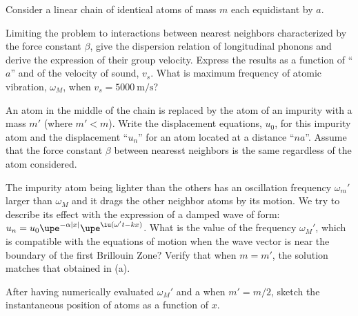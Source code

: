 \begin{problem}
  Consider a linear chain of identical atoms of mass $m$ each equidistant
  by $a$.
  \begin{enumext}[label = (\alph*)]
    \item Limiting the problem to interactions between nearest neighbors
    characterized by the force constant $\beta$, give the dispersion relation
    of longitudinal phonons and derive the expression of their group velocity.
    Express the results as a function of ``$a$'' and of the velocity of sound,
    $v_s$.
    What is maximum frequency of atomic vibration, $\omega_M$,
    when $v_s = \qty{5000}{\m/\s}$?
    \item An atom in the middle of the chain is replaced by the atom of an
    impurity with a mass $m'$ (where $m' < m$).
    Write the displacement equations, $u_0$, for this impurity atom and the
    displacement ``$u_n$'' for an atom located at a distance ``$na$''.
    Assume that the force constant $\beta$ between nearesst neighbors is the
    same regardless of the atom considered.
    \item The impurity atom being lighter than the others has an oscillation
    frequency $\omega_m'$ larger than $\omega_M$ and it drags the other
    neighbor atoms by its motion. We try to describe its effect with the
    expression of a damped wave of
    form: $u_n = u_0\upe^{-\alpha|x|} \upe^{\iu(\omega't-kx)}$.
    What is the value of the frequency $\omega_M'$, which is compatible with
    the equations of motion when the wave vector is near the boundary of the
    first Brillouin Zone? Verify that when $m = m'$, the solution matches that
    obtained in (a).
    \item After having numerically evaluated $\omega_M'$ and a when $m' = m/2$,
    sketch the instantaneous position of atoms as a function of $x$.
  \end{enumext}
\end{problem}
